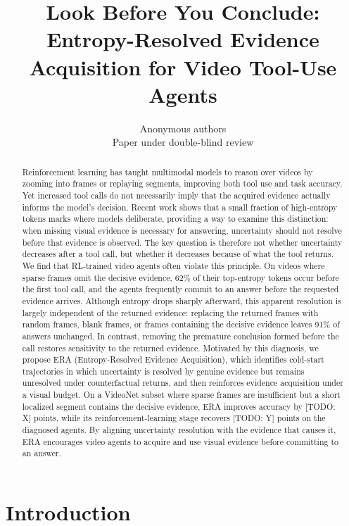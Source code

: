 \documentclass{article}
\title{Look Before You Conclude: Entropy-Resolved Evidence Acquisition for Video Tool-Use Agents}
\author{Anonymous authors \\ Paper under double-blind review}
\newcommand{\todo}[1]{{\color{red}[TODO: #1]}}
\begin{document}
\maketitle

\begin{abstract}
Reinforcement learning has taught multimodal models to reason over videos by zooming into frames or replaying segments, improving both tool use and task accuracy. Yet increased tool calls do not necessarily imply that the acquired evidence actually informs the model’s decision. Recent work shows that a small fraction of high-entropy tokens marks where models deliberate, providing a way to examine this distinction: when missing visual evidence is necessary for answering, uncertainty should not resolve before that evidence is observed. The key question is therefore not whether uncertainty decreases after a tool call, but whether it decreases because of what the tool returns. We find that RL-trained video agents often violate this principle. On videos where sparse frames omit the decisive evidence, 62\% of their top-entropy tokens occur before the first tool call, and the agents frequently commit to an answer before the requested evidence arrives. Although entropy drops sharply afterward, this apparent resolution is largely independent of the returned evidence: replacing the returned frames with random frames, blank frames, or frames containing the decisive evidence leaves 91\% of answers unchanged. In contrast, removing the premature conclusion formed before the call restores sensitivity to the returned evidence. Motivated by this diagnosis, we propose ERA (Entropy-Resolved Evidence Acquisition), which identifies cold-start trajectories in which uncertainty is resolved by genuine evidence but remains unresolved under counterfactual returns, and then reinforces evidence acquisition under a visual budget. On a VideoNet subset where sparse frames are insufficient but a short localized segment contains the decisive evidence, ERA improves accuracy by \todo{X} points, while its reinforcement-learning stage recovers \todo{Y} points on the diagnosed agents. By aligning uncertainty resolution with the evidence that causes it, ERA encourages video agents to acquire and use visual evidence before committing to an answer.
\end{abstract}

\section{Introduction}
\label{sec:intro}
\end{document}
